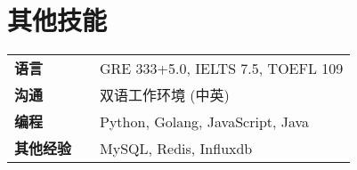 \documentclass[a4,12pt]{article}
\newcommand{\hskills}[1]{
\textbf{\bfseries #1} }
\begin{document}
\section{\textbf{其他技能}}
\begin{tabular}{p{11em} p{1em} p{43em}}
\hskills{语言} & & GRE 333+5.0, IELTS 7.5, TOEFL 109 \\
\hskills{沟通} & & 双语工作环境 (中英)  \\
\hskills{编程} &  & Python, Golang, JavaScript, Java \\
\hskills{其他经验} & & MySQL, Redis, Influxdb
\end{tabular}
\vspace{-0.2cm}
\end{document}
